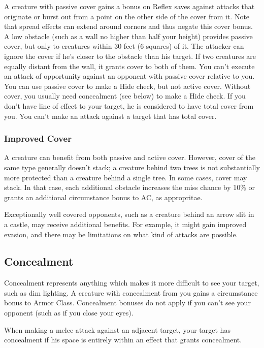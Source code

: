  A creature with passive cover gains a  bonus on Reflex saves against attacks that originate or burst out from a point on the other side of the cover from it. Note that spread effects can extend around corners and thus negate this cover bonus.
 A low obstacle (such as a wall no higher than half your height) provides passive cover, but only to creatures within 30 feet (6 squares) of it. The attacker can ignore the cover if he's closer to the obstacle than his target. If two creatures are equally distant from the wall, it grants cover to both of them.
 You can't execute an attack of opportunity against an opponent with passive cover relative to you.
 You can use passive cover to make a Hide check, but not active cover. Without cover, you usually need concealment (see below) to make a Hide check.
 If you don't have line of effect to your target, he is considered to have total cover from you. You can't make an attack against a target that has total cover.

\subsubsection{Improved Cover}

A creature can benefit from both passive and active cover. However, cover of the same type generally doesn't stack; a creature behind two trees is not substantially more protected than a creature behind a single tree. In some cases, cover may stack. In that case, each additional obstacle increases the miss chance by 10\% or grants an additional  circumstance bonus to AC, as appropritae.

Exceptionally well covered opponents, such as a creature behind an arrow slit in a castle, may receive additional benefits. For example, it might gain improved evasion, and there may be limitations on what kind of attacks are possible.

\subsection{Concealment}
Concealment represents anything which makes it more difficult to see your target, such as dim lighting. A creature with concealment from you gains a  circumstance bonus to Armor Class. Concealment bonuses do not apply if you can't see your opponent (such as if you close your eyes).

 When making a melee attack against an adjacent target, your target has concealment if his space is entirely within an effect that grants concealment.

